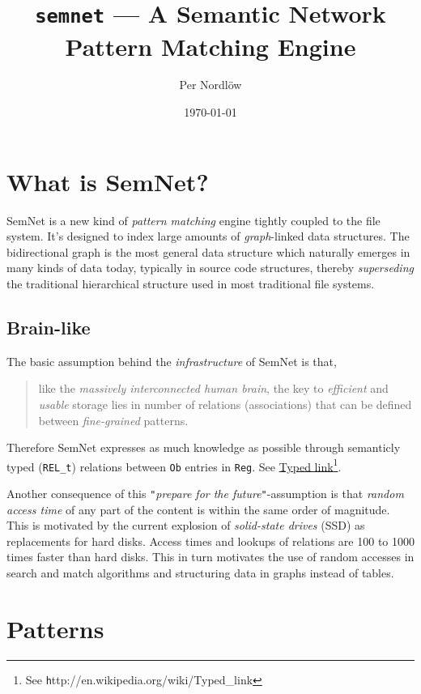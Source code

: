 \documentclass[a4paper,10pt,twocolumn]{article}
\title{\texttt{semnet} --- A Semantic Network Pattern Matching Engine}
\author{Per Nordlöw}
\date{\today}
\newcommand{\codeCxx}[1]{\lstset{language=C++}\lstinline!#1!}
\newcommand{\codeREL}[1]{\lstset{language=C++}\lstinline!REL_#1!}
\newcommand{\hrefn}[2]{\href{#1}{#2}\footnote{See {\texttt #1}}} %
\newcommand{\sn}[0]{SemNet}
\begin{document}
\maketitle


\tableofcontents

\section{What is SemNet?}
\sn{} is a new kind of \emph{pattern matching} engine tightly coupled to the
file system. It's designed to index large amounts of \emph{graph}-linked data
structures. The bidirectional graph is the most general data structure which
naturally emerges in many kinds of data today, typically in source code
structures, thereby \emph{superseding} the traditional hierarchical structure
used in most traditional file systems.

\subsection{Brain-like}

The basic assumption behind the \emph{infrastructure} of \sn{} is that,

\begin{quotation}
  like the \emph{massively interconnected human brain}, the key to
  \emph{efficient} and \emph{usable} storage lies in number of relations
  (associations) that can be defined between \emph{fine-grained} patterns.
\end{quotation}

Therefore \sn{} expresses as much knowledge as possible through semanticly
typed (\codeREL{t}) relations between \codeCxx{Ob} entries in
\codeCxx{Reg}. See \hrefn{http://en.wikipedia.org/wiki/Typed_link}{Typed link}.

Another consequence of this \texttt{{}"{}}\emph{prepare for the
  future}\texttt{{}"{}}-assumption is that \emph{random access time} of any part
of the content is within the same order of magnitude. This is motivated by the
current explosion of \emph{solid-state drives} (SSD) as replacements for hard
disks. Access times and lookups of relations are 100 to 1000 times faster than
hard disks. This in turn motivates the use of random accesses in search and
match algorithms and structuring data in graphs instead of tables.

\section{Patterns}
\end{document}

